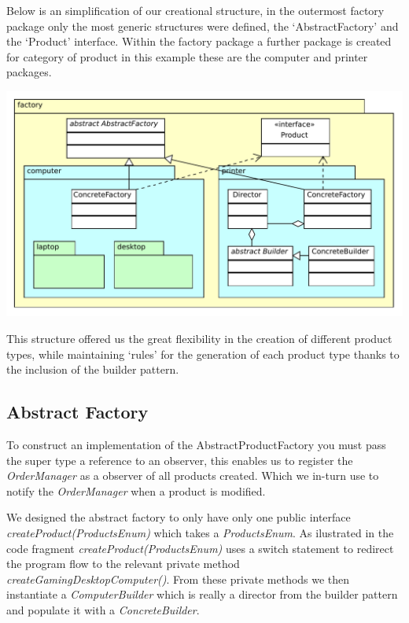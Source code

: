 \documentclass[pdftex,11pt,a4paper]{article}
\begin{document}
Below is an simplification of our creational structure, in the outermost factory package only the most generic structures were defined, the ‘AbstractFactory’ and the ‘Product’ interface. Within the factory package a further package is created for category of product in this example these are the computer and printer packages.

\begin{center}
	\includegraphics[scale=0.75]{images/creational_diagram.pdf}
\end{center}

This structure offered us the great flexibility in the creation of different product types, while maintaining ‘rules’ for the generation of each product type thanks to the inclusion of the builder pattern.

\subsection{Abstract Factory}

To construct an implementation of the AbstractProductFactory you must pass the super type a reference to an observer, this enables us to register the \emph{OrderManager} as a observer of all products created. Which we in-turn use to notify the \emph{OrderManager} when a product is modified.

We designed the abstract factory to only have only one public interface \emph{createProduct(ProductsEnum)} which takes a \emph{ProductsEnum}. As ilustrated in the code fragment \emph{createProduct(ProductsEnum)} uses a switch statement to redirect the program flow to the relevant private method \emph{createGamingDesktopComputer()}. From these private methods we then instantiate a \emph{ComputerBuilder} which is really a director from the builder pattern and populate it with a \emph{ConcreteBuilder}.
\end{document}
